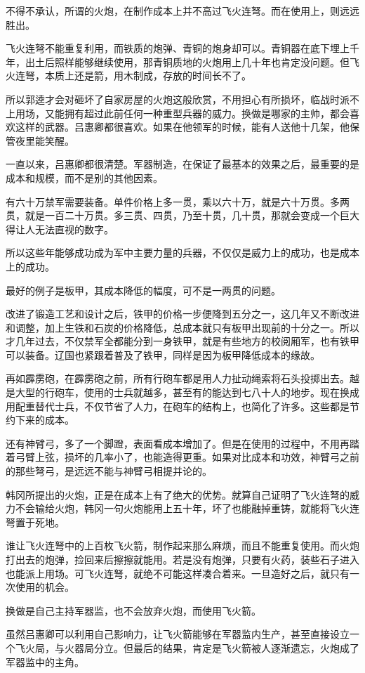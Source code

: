 不得不承认，所谓的火炮，在制作成本上并不高过飞火连弩。而在使用上，则远远胜出。

飞火连弩不能重复利用，而铁质的炮弹、青铜的炮身却可以。青铜器在底下埋上千年，出土后照样能够继续使用，那青铜质地的火炮用上几十年也肯定没问题。但飞火连弩，本质上还是箭，用木制成，存放的时间长不了。

所以郭逵才会对砸坏了自家房屋的火炮这般欣赏，不用担心有所损坏，临战时派不上用场，又能拥有超过此前任何一种重型兵器的威力。换做是哪家的主帅，都会喜欢这样的武器。吕惠卿都很喜欢。如果在他领军的时候，能有人送他十几架，他保管夜里能笑醒。

一直以来，吕惠卿都很清楚。军器制造，在保证了最基本的效果之后，最重要的是成本和规模，而不是别的其他因素。

有六十万禁军需要装备。单件价格上多一贯，乘以六十万，就是六十万贯。多两贯，就是一百二十万贯。多三贯、四贯，乃至十贯，几十贯，那就会变成一个巨大得让人无法直视的数字。

所以这些年能够成功成为军中主要力量的兵器，不仅仅是威力上的成功，也是成本上的成功。

最好的例子是板甲，其成本降低的幅度，可不是一两贯的问题。

改进了锻造工艺和设计之后，铁甲的价格一步便降到五分之一，这几年又不断改进和调整，加上生铁和石炭的价格降低，总成本就只有板甲出现前的十分之一。所以才几年过去，不仅禁军全都能分到一身铁甲，就是有些地方的校阅厢军，也有铁甲可以装备。辽国也紧跟着普及了铁甲，同样是因为板甲降低成本的缘故。

再如霹雳砲，在霹雳砲之前，所有行砲车都是用人力扯动绳索将石头投掷出去。越是大型的行砲车，使用的士兵就越多，甚至有的能达到七八十人的地步。现在换成用配重替代士兵，不仅节省了人力，在砲车的结构上，也简化了许多。这些都是节约下来的成本。

还有神臂弓，多了一个脚蹬，表面看成本增加了。但是在使用的过程中，不用再踏着弓臂上弦，损坏的几率小了，也能造得更重。如果对比成本和功效，神臂弓之前的那些弩弓，是远远不能与神臂弓相提并论的。

韩冈所提出的火炮，正是在成本上有了绝大的优势。就算自己证明了飞火连弩的威力不会输给火炮，韩冈一句火炮能用上五十年，坏了也能融掉重铸，就能将飞火连弩置于死地。

谁让飞火连弩中的上百枚飞火箭，制作起来那么麻烦，而且不能重复使用。而火炮打出去的炮弹，捡回来后擦擦就能用。若是没有炮弹，只要有火药，装些石子进入也能派上用场。可飞火连弩，就绝不可能这样凑合着来。一旦造好之后，就只有一次使用的机会。

换做是自己主持军器监，也不会放弃火炮，而使用飞火箭。

虽然吕惠卿可以利用自己影响力，让飞火箭能够在军器监内生产，甚至直接设立一个飞火局，与火器局分立。但最后的结果，肯定是飞火箭被人逐渐遗忘，火炮成了军器监中的主角。

